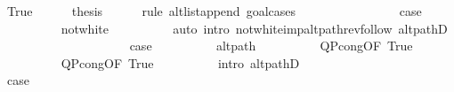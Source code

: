 \begin{isabellebody}
\ True\isanewline
\ \ \ \ \isamarkupfalse%
\ {\isacharquery}{\kern0pt}thesis\isanewline
\ \ \ \ \isamarkupfalse%
\ {\isacharparenleft}{\kern0pt}rule\ alt{\isacharunderscore}{\kern0pt}list{\isacharunderscore}{\kern0pt}append{\isacharunderscore}{\kern0pt}{}{\isacharprime}{\kern0pt}{\isacharcomma}{\kern0pt}\ goal{\isacharunderscore}{\kern0pt}cases{\isacharparenright}{\kern0pt}\isanewline
\ \ \ \ \ \ \isamarkupfalse%
\ {}\isanewline
\ \ \ \ \ \ \isamarkupfalse%
\ {\isacharquery}{\kern0pt}case\isanewline
\ \ \ \ \ \ \ \ \isamarkupfalse%
\ not{\isacharunderscore}{\kern0pt}white\isanewline
\ \ \ \ \ \ \ \ \isamarkupfalse%
\ {\isacharparenleft}{\kern0pt}auto\ intro{\isacharcolon}{\kern0pt}\ not{\isacharunderscore}{\kern0pt}white{\isacharunderscore}{\kern0pt}imp{\isacharunderscore}{\kern0pt}alt{\isacharunderscore}{\kern0pt}path{\isacharunderscore}{\kern0pt}rev{\isacharunderscore}{\kern0pt}follow\ alt{\isacharunderscore}{\kern0pt}pathD{\isacharparenleft}{\kern0pt}{}{\isacharparenright}{\kern0pt}{\isacharparenright}{\kern0pt}\isanewline
\ \ \ \ \isamarkupfalse%
\isanewline
\ \ \ \ \ \ \isamarkupfalse%
\ {}\isanewline
\ \ \ \ \ \ \isamarkupfalse%
\ {\isacharquery}{\kern0pt}case\isanewline
\ \ \ \ \ \ \ \ \isamarkupfalse%
\ alt{\isacharunderscore}{\kern0pt}path\isanewline
\ \ \ \ \ \ \ \ \isamarkupfalse%
\ Q{\isacharunderscore}{\kern0pt}P{\isacharprime}{\kern0pt}{\isacharprime}{\kern0pt}{\isacharunderscore}{\kern0pt}cong{\isacharparenleft}{\kern0pt}{}{\isacharparenright}{\kern0pt}{\isacharbrackleft}{\kern0pt}OF\ True{\isacharbrackright}{\kern0pt}\isanewline
\ \ \ \ \ \ \ \ \isamarkupfalse%
\ Q{\isacharunderscore}{\kern0pt}P{\isacharprime}{\kern0pt}{\isacharprime}{\kern0pt}{\isacharunderscore}{\kern0pt}cong{\isacharparenleft}{\kern0pt}{}{\isacharparenright}{\kern0pt}{\isacharbrackleft}{\kern0pt}OF\ True{\isacharbrackright}{\kern0pt}\isanewline
\ \ \ \ \ \ \ \ \isamarkupfalse%
\ {\isacharparenleft}{\kern0pt}intro\ alt{\isacharunderscore}{\kern0pt}pathD{\isacharparenleft}{\kern0pt}{}{\isacharparenright}{\kern0pt}{\isacharparenright}{\kern0pt}\isanewline
\ \ \ \ \isamarkupfalse%
\isanewline
\ \ \ \ \ \ \isamarkupfalse%
\ {}\isanewline
\ \ \ \ \ \ \isamarkupfalse%
\ {\isacharquery}{\kern0pt}case\isanewline

\end{isabellebody}

